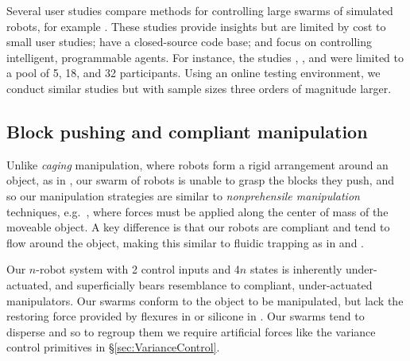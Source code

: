 


Several user studies compare methods for controlling large swarms of simulated robots, for example \cite{bashyal2008human,de2012controllability,kolling2012towards}.  These studies provide insights but are limited by cost to small user studies; have a closed-source code base; and focus on controlling intelligent, programmable agents.  
For instance, the studies \cite{bashyal2008human},  \cite{de2012controllability}, and \cite{kolling2012towards}  were limited to a pool of 5, 18, and 32  participants.
	Using an online testing environment, we conduct similar studies but with sample sizes three orders of magnitude larger.

\subsection{Block pushing and compliant manipulation}
Unlike \emph{caging} manipulation, where robots form a rigid arrangement around an object, as in \cite{Sudsang2002,Fink2008}, our swarm of robots is unable to grasp the blocks they push, and so our manipulation strategies are similar to \emph{nonprehensile manipulation} techniques, e.g.~\cite{Lynch1999}, where forces must be applied along the center of mass of the moveable object. A key difference is that our robots are compliant and tend to flow around the object, making this similar to fluidic trapping as in \cite{Armani2006} and \cite{Becker2009}.  

Our $n$-robot system with 2 control inputs and 4$n$ states is inherently under-actuated, and superficially bears resemblance to compliant, under-actuated manipulators.  Our swarms conform to the object to be manipulated, but lack the restoring force provided by flexures in \cite{odhner2014compliant} or silicone in \cite{deimel2014novel}.  Our swarms tend to disperse and so to regroup them we require artificial forces like the variance control primitives in \S \ref{sec:VarianceControl}.


